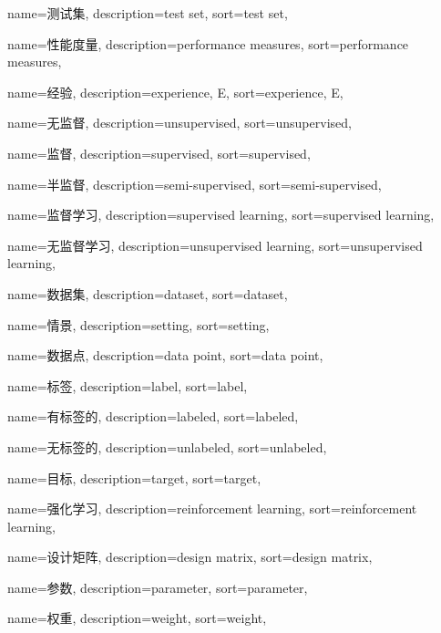 {
  name=测试集,
  description={test set},
  sort={test set},
}

{
  name=性能度量,
  description={performance measures},
  sort={performance measures},
}

{
  name=经验,
  description={experience, E},
  sort={experience, E},
}

{
  name=无监督,
  description={unsupervised},
  sort={unsupervised},
}

{
  name=监督,
  description={supervised},
  sort={supervised},
}

{
  name=半监督,
  description={semi-supervised},
  sort={semi-supervised},
}

{
  name=监督学习,
  description={supervised learning},
  sort={supervised learning},
}

{
  name=无监督学习,
  description={unsupervised learning},
  sort={unsupervised learning},
}

{
  name=数据集,
  description={dataset},
  sort={dataset},
}

{
	name=情景,
	description={setting},
	sort={setting},
}

{
  name=数据点,
  description={data point},
  sort={data point},
}

{
  name=标签,
  description={label},
  sort={label},
}

{
	name=有标签的,
	description={labeled},
	sort={labeled},
}

{
	name=无标签的,
	description={unlabeled},
	sort={unlabeled},
}


{
  name=目标,
  description={target},
  sort={target},
}

{
  name=强化学习,
  description={reinforcement learning},
  sort={reinforcement learning},
}

{
  name=设计矩阵,
  description={design matrix},
  sort={design matrix},
}

{
  name=参数,
  description={parameter},
  sort={parameter},
}

{
  name=权重,
  description={weight},
  sort={weight},
}

